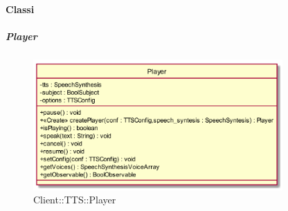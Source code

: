 \paragraph{Classi}
\hypertarget{Player_label}{\subparagraph{Player}}
\begin{figure}[h]
	\centering
	\includegraphics[width=0.85\textwidth,height=\textheight,keepaspectratio]{images/ClassPlayer.png}
	\caption{Client::TTS::Player}
\end{figure}
